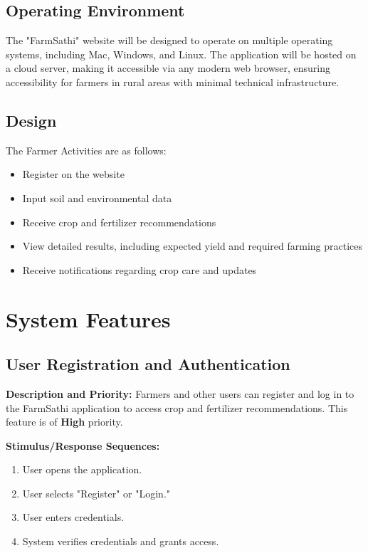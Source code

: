 \documentclass{scrreprt}
\begin{document}

\section{Operating Environment}
The "FarmSathi" website will be designed to operate on multiple operating systems, including Mac, Windows, and Linux. The application will be hosted on a cloud server, making it accessible via any modern web browser, ensuring accessibility for farmers in rural areas with minimal technical infrastructure.

\section{Design}
The Farmer Activities are as follows:
\begin{itemize}
    \item Register on the website
    \item Input soil and environmental data
    \item Receive crop and fertilizer recommendations
    \item View detailed results, including expected yield and required farming practices
    \item Receive notifications regarding crop care and updates
\end{itemize}

\chapter{System Features}

\section{User Registration and Authentication}
\textbf{Description and Priority:} \newline 
Farmers and other users can register and log in to the FarmSathi application to access crop and fertilizer recommendations. This feature is of \textbf{High} priority.
\newline

\textbf{Stimulus/Response Sequences:}  
\begin{enumerate}
    \item User opens the application.
    \item User selects "Register" or "Login."
    \item User enters credentials.
    \item System verifies credentials and grants access.
\end{enumerate}
\end{document}
